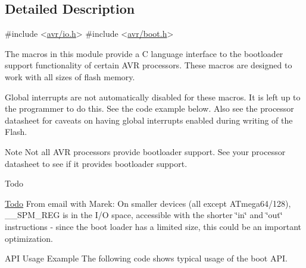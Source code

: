 \subsection{Detailed Description}

\begin{DoxyCode}
\textcolor{preprocessor}{#include <\hyperlink{io_8h}{avr/io.h}>}
\textcolor{preprocessor}{#include <\hyperlink{boot_8h}{avr/boot.h}>}
\end{DoxyCode}


The macros in this module provide a C language interface to the bootloader support functionality of certain A\+VR processors. These macros are designed to work with all sizes of flash memory.

Global interrupts are not automatically disabled for these macros. It is left up to the programmer to do this. See the code example below. Also see the processor datasheet for caveats on having global interrupts enabled during writing of the Flash.

\begin{DoxyNote}{Note}
Not all A\+VR processors provide bootloader support. See your processor datasheet to see if it provides bootloader support.
\end{DoxyNote}
\begin{DoxyRefDesc}{Todo}
\item[\hyperlink{todo__todo000001}{Todo}]From email with Marek\+: On smaller devices (all except A\+Tmega64/128), \+\_\+\+\_\+\+S\+P\+M\+\_\+\+R\+EG is in the I/O space, accessible with the shorter \char`\"{}in\char`\"{} and \char`\"{}out\char`\"{} instructions -\/ since the boot loader has a limited size, this could be an important optimization.\end{DoxyRefDesc}


\begin{DoxyParagraph}{A\+PI Usage Example}
The following code shows typical usage of the boot A\+PI.
\end{DoxyParagraph}


